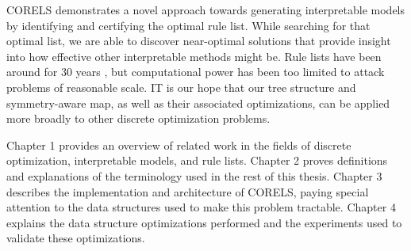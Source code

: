 CORELS demonstrates a novel approach towards generating interpretable models by identifying and certifying the optimal rule list. 
While searching for that optimal list, we are able to discover near-optimal solutions that provide insight into how effective other interpretable methods might be. 
Rule lists have been around for 30 years \cite{Rivest87}, but computational power has been too limited to attack problems of reasonable scale.
IT is our hope that our tree structure and symmetry-aware map, as well as their associated optimizations, can be applied more broadly to other discrete optimization problems.

Chapter 1 provides an overview of related work in the fields of discrete optimization, interpretable models, and rule lists. 
Chapter 2 proves definitions and explanations of the terminology used in the rest of this thesis.
Chapter 3 describes the implementation and architecture of CORELS, paying special attention to the data structures used to make this problem tractable.
Chapter 4 explains the data structure optimizations performed and the experiments used to validate these optimizations.